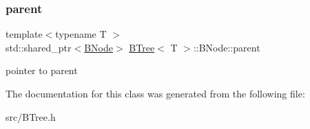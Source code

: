 \subsubsection{\texorpdfstring{parent}{parent}}
{\footnotesize\ttfamily template$<$typename T $>$ \\
std\+::shared\+\_\+ptr$<$\hyperlink{classBTree_1_1BNode}{B\+Node}$>$ \hyperlink{classBTree}{B\+Tree}$<$ T $>$\+::B\+Node\+::parent}

pointer to parent 

The documentation for this class was generated from the following file\+:\begin{DoxyCompactItemize}
\item 
src/B\+Tree.\+h\end{DoxyCompactItemize}

